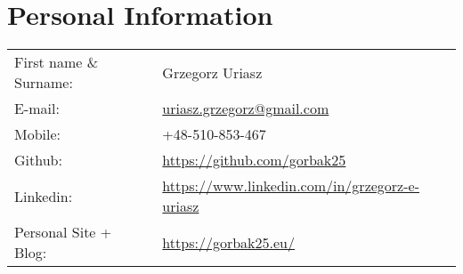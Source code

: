 \section{\sc Personal Information}

\vspace{.05in}
\begin{tabular}{@{}p{1.8in}p{3in}}
First name \& Surname: & Grzegorz Uriasz \\
E-mail: & \href{mailto:uriasz.grzegorz@gmail.com}{uriasz.grzegorz@gmail.com} \\
Mobile: & +48-510-853-467 \\
Github: & \href{https://github.com/gorbak25}{https://github.com/gorbak25} \\
Linkedin: & \href{https://www.linkedin.com/in/grzegorz-e-uriasz}{https://www.linkedin.com/in/grzegorz-e-uriasz} \\
Personal Site + Blog: & \href{https://gorbak25.eu/}{https://gorbak25.eu/} \\
\end{tabular}
\vspace{-0.1in}
